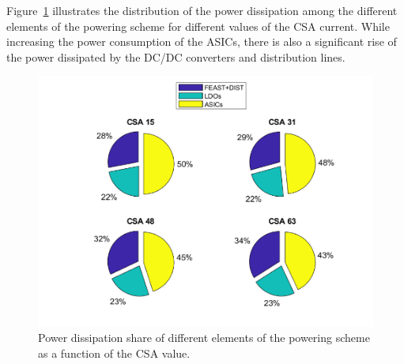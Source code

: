 Figure~\ref{fig_power_CSA} illustrates the distribution of the power dissipation among the different elements of the powering scheme for different values of the \gls{CSA} current. While increasing the power consumption of the \glspl{ASIC}, there is also a  significant rise of the power dissipated by the DC/DC converters and distribution lines. %

\begin{figure}[h!]
\centering
\includegraphics[width=0.65\columnwidth]{Chapter6/DCS/images/POBpie.png}
\caption{Power dissipation share of different elements of the powering scheme as a function of the \gls{CSA} value.}
\label{fig_power_CSA}
\end{figure}


